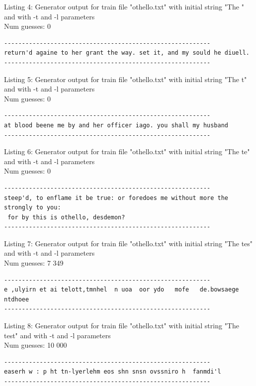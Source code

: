 \documentclass{article}
\begin{document}
Listing 4: Generator output for train file "othello.txt" with initial string "The " and with -t and -l parameters
\\Num guesses: 0

\begin{lstlisting}
----------------------------------------------------------
return'd againe to her grant the way. set it, and my sould he diuell.
----------------------------------------------------------
\end{lstlisting}

Listing 5: Generator output for train file "othello.txt" with initial string "The t" and with -t and -l parameters
\\Num guesses: 0

\begin{lstlisting}
----------------------------------------------------------
at blood beene me by and her officer iago. you shall my husband
----------------------------------------------------------
\end{lstlisting}

Listing 6: Generator output for train file "othello.txt" with initial string "The te" and with -t and -l parameters
\\Num guesses: 0

\begin{lstlisting}
----------------------------------------------------------
steep'd, to enflame it be true: or foredoes me without more the strongly to you:
 for by this is othello, desdemon?
----------------------------------------------------------
\end{lstlisting}

Listing 7: Generator output for train file "othello.txt" with initial string "The tes" and with -t and -l parameters
\\Num guesses: 7 349

\begin{lstlisting}
----------------------------------------------------------
e ,ulyirn et ai telott,tmnhel  n uoa  oor ydo   mofe   de.bowsaege ntdhoee 
----------------------------------------------------------
\end{lstlisting}

Listing 8: Generator output for train file "othello.txt" with initial string "The test" and with -t and -l parameters
\\Num guesses: 10 000

\begin{lstlisting}
----------------------------------------------------------
easerh w : p ht tn-lyerlehm eos shn snsn ovssniro h  fanmdi'l
----------------------------------------------------------
\end{lstlisting}
\end{document}
